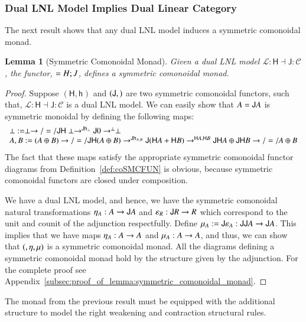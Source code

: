 \documentclass{lmcs}
\newtheorem{lemma}[theorem]{Lemma}
\let\mto\to
\let\to\relax
\newcommand{\to}{\rightarrow}
\let\r\relax
\let\j\relax
\let\wn\relax
\let\H\relax
\newcommand{\cat}[1]{\mathcal{#1}}
\newcommand{\func}[1]{\mathsf{#1}}
\newcommand{\H}[0]{\func{H}}
\newcommand{\J}[0]{\func{J}}
\newcommand{\h}[1]{\mathsf{h}_{#1}}
\newcommand{\r}[1]{\mathsf{r}_{#1}}
\newcommand{\j}[1]{\mathsf{j}_{#1}}
\newcommand{\wn}[0]{\mathop{?}}
\begin{document}
\subsubsection{Dual LNL Model Implies Dual Linear Category}
\label{subsec:dual_lnl_model_implies_dual_category}

The next result shows that any dual LNL model induces a symmetric
comonoidal monad.
\begin{lemma}[Symmetric Comonoidal Monad]
  \label{lemma:symmetric_comonoidal_monad}
  Given a dual LNL model $\cat{L} : \func{H} \dashv \func{J} : \cat{C}$,
  the functor, $\wn = H;J$, defines a symmetric comonoidal monad.
\end{lemma}
\begin{proof}
  Suppose $(\func{H},\h{})$ and $(\func{J},\j{})$ are two symmetric
  comonoidal functors, such that, $\cat{L} : \func{H} \dashv \func{J}
  : \cat{C}$ is a dual LNL model.  We can easily show that $\wn A = \J\H
  A$ is symmetric monoidal by defining the following maps:
  \[
  \begin{array}{lll}
    \r{\perp} := \wn \perp \mto/=/ \func{JH}\perp \mto^{\func{J}\h{\perp}} \func{J}0 \mto^{\j{\perp}} \perp\\
    \r{A,B} := \wn (A \oplus B) \mto/=/ \func{JH}(A \oplus B) \mto^{\func{J}\h{A,B}} \func{J}(\func{H}A + \func{H}B) \mto^{\j{\func{H}A,\func{H}B}} \func{JH}A \oplus \func{JH}B \mto/=/ \wn A \oplus \wn B\\
  \end{array}
  \]
  The fact that these maps satisfy the appropriate symmetric
  comonoidal functor diagrams from Definition~\ref{def:coSMCFUN} is
  obvious, because symmetric comonoidal functors are closed under
  composition.  

  We have a dual LNL model, and hence, we have the symmetric comonoidal
  natural transformations $\eta_A : A \mto \J\H A$ and $\varepsilon_R
  : \H\J R \mto R$ which correspond to the unit and counit of the
  adjunction respectfully.  Define $\mu_A := \J\varepsilon_{\H A} :
  \J\H\J\H A \mto \J\H A$.  This implies that we have maps $\eta_A : A
  \mto \wn A$ and $\mu_A : \wn\wn A \mto \wn A$, and thus, we can show
  that $(\wn, \eta, \mu)$ is a symmetric comonoidal monad.  All
  the diagrams defining a symmetric comonoidal monad hold by the
  structure given by the adjunction.  For the complete proof see
  Appendix~\ref{subsec:proof_of_lemma:symmetric_comonoidal_monad}.
\end{proof}

The monad from the previous result must be equipped with the
additional structure to model the right weakening and contraction
structural rules.
\end{document}
